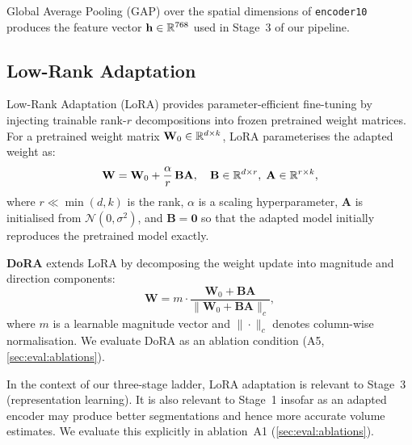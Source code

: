Global Average Pooling (GAP) over the spatial dimensions of \texttt{encoder10}
produces the feature vector $\mathbf{h} \in \mathbb{R}^{768}$ used in Stage~3 of our
pipeline.

\subsection{Low-Rank Adaptation}
\label{sec:bg:lora}

Low-Rank Adaptation (LoRA) \cite{hu2022lora} provides parameter-efficient
fine-tuning by injecting trainable rank-$r$ decompositions into frozen
pretrained weight matrices. For a pretrained weight matrix
$\mathbf{W}_0 \in \mathbb{R}^{d \times k}$, LoRA parameterises the adapted weight as:
\begin{equation}
  \mathbf{W} = \mathbf{W}_0 + \frac{\alpha}{r}\, \mathbf{B}\mathbf{A},
  \quad \mathbf{B} \in \mathbb{R}^{d \times r},\; \mathbf{A} \in \mathbb{R}^{r \times k},
  \label{eq:lora}
\end{equation}
where $r \ll \min(d, k)$ is the rank, $\alpha$ is a scaling hyperparameter,
$\mathbf{A}$ is initialised from $\mathcal{N}(0, \sigma^2)$, and
$\mathbf{B} = \mathbf{0}$ so that the adapted model initially reproduces the
pretrained model exactly.

\textbf{DoRA} \cite{liu2024dora} extends LoRA by decomposing the weight
update into magnitude and direction components:
\begin{equation}
  \mathbf{W} = m \cdot \frac{\mathbf{W}_0 + \mathbf{B}\mathbf{A}}
    {\|\mathbf{W}_0 + \mathbf{B}\mathbf{A}\|_c},
  \label{eq:dora}
\end{equation}
where $m$ is a learnable magnitude vector and $\|\cdot\|_c$ denotes
column-wise normalisation. We evaluate DoRA as an ablation condition
(A5, \cref{sec:eval:ablations}).

In the context of our three-stage ladder, LoRA adaptation is relevant to
Stage~3 (representation learning). It is also relevant to Stage~1 insofar
as an adapted encoder may produce better segmentations and hence more
accurate volume estimates. We evaluate this explicitly in ablation~A1
(\cref{sec:eval:ablations}).

